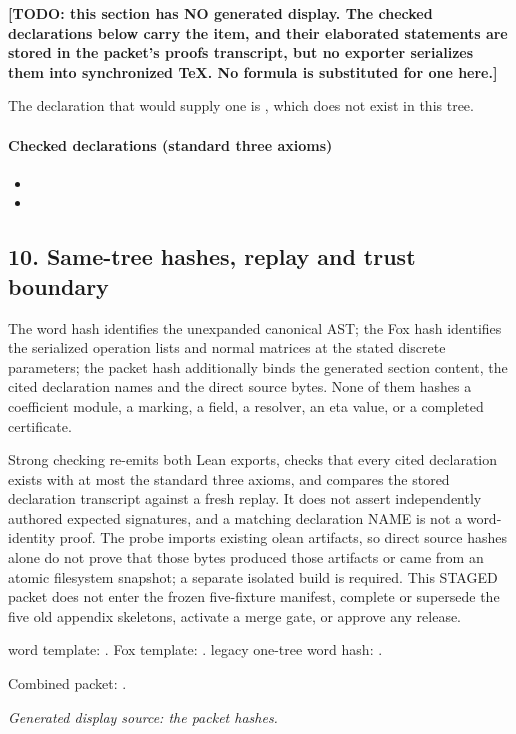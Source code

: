\par\noindent\textbf{[TODO: this section has NO generated display. The checked declarations below carry the item, and their elaborated statements are stored in the packet's proofs transcript, but no exporter serializes them into synchronized TeX. No formula is substituted for one here.]}
\par\noindent The declaration that would supply one is , which does not exist in this tree.
\paragraph{Checked declarations (standard three axioms)}
\begin{itemize}
\item {}
\item {}
\end{itemize}

\subsection*{10. Same-tree hashes, replay and trust boundary}
The word hash identifies the unexpanded canonical AST; the Fox hash identifies the serialized operation lists and normal matrices at the stated discrete parameters; the packet hash additionally binds the generated section content, the cited declaration names and the direct source bytes. None of them hashes a coefficient module, a marking, a field, a resolver, an eta value, or a completed certificate.

Strong checking re-emits both Lean exports, checks that every cited declaration exists with at most the standard three axioms, and compares the stored declaration transcript against a fresh replay. It does not assert independently authored expected signatures, and a matching declaration NAME is not a word-identity proof. The probe imports existing olean artifacts, so direct source hashes alone do not prove that those bytes produced those artifacts or came from an atomic filesystem snapshot; a separate isolated build is required. This STAGED packet does not enter the frozen five-fixture manifest, complete or supersede the five old appendix skeletons, activate a merge gate, or approve any release.

word template: .
Fox template: .
legacy one-tree word hash: .
\par Combined packet: .
\par\noindent\emph{Generated display source: the packet hashes.}
